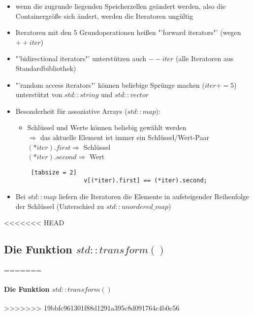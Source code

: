 \documentclass{article}
\begin{document}
\begin{itemize}
\begin{lstlisting} [tabsize = 2]
				// Abkuerzung in C++: rang-based for-loop
				for (int & element : v) {
					int current = element;  // lesen
					element = new_value;  // schreiben
				}
			}
		\end{lstlisting}
		\item wenn die zugrunde liegenden Speicherzellen geändert werden, also die Containergröße sich ändert, werden die Iteratoren ungültig
		\item Iteratoren mit den 5 Grundoperationen heißen "'forward iterators"' (wegen $++iter$)
		\item "'bidirectional iterators"' unterstützen auch $--iter$ (alle Iteratoren aus Standardbibliothek)
		\item "'random access iterators"' können beliebige Sprünge machen ($iter+=5$) \\
		unterstützt von $std::string$ und $std::vector$
		\item Besonderheit für assoziative Arrays ($std::map$):
		\begin{itemize}
			\item Schlüssel und Werte können beliebig gewählt werden \\
			$\Rightarrow$ das aktuelle Element ist immer ein Schlüssel/Wert-Paar \\
			$(*iter).first \Rightarrow$ Schlüssel \\
			$(*iter).second \Rightarrow$ Wert
			\begin{lstlisting} [tabsize = 2]
				v[(*iter).first] == (*iter).second;
			\end{lstlisting}
		\end{itemize}
		\item Bei $std::map$ liefern die Iteratoren die Elemente in aufsteigender Reihenfolge der Schlüssel (Unterschied zu $std::unordered\_map$)
	\end{itemize}
	
<<<<<<< HEAD
	\subsection{Die Funktion $std::transform()$}
=======
	\paragraph{Die Funktion $std::transform()$}
>>>>>>> 19bbfc961301f88d1291a395c8d091764c4b0c56
	
\end{document}
